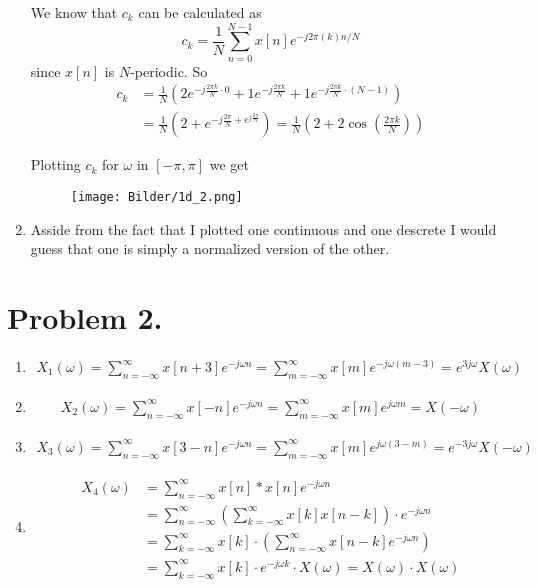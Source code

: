 \documentclass[a4paper,11pt,norsk]{article}
\begin{document}
\begin{enumerate}
        We know that $c_k$ can be calculated as 
        \[
            c_k = \frac{1}{N}\sum_{n=0}^{N-1}x[n] e^{-j2\pi(k)n/N}
        \]
        since $x[n]$ is $N$-periodic. So
        \begin{align*}
            c_k &= \frac{1}{N}\left(2e^{-j\frac{2\pi k}{N} \cdot 0} + 1e^{-j\frac{2\pi k}{N}} + 1e^{-j\frac{2\pi k}{N} \cdot (N - 1)}\right) \\
                &= \frac{1}{N}\left(2 + e^{-j\frac{2\pi}{N} + e^{j\frac{2\pi}{N}}}\right) = \frac{1}{N}\left(2 + 2\cos\left(\frac{2\pi k}{N}\right)\right)
        \end{align*}

        Plotting $c_k$ for $\omega$ in $[-\pi, \pi]$ we get
        \begin{figure}[H]
            \center
            \texttt{[image: Bilder/1d\_2.png]}
        \end{figure}

    \item Asside from the fact that I plotted one continuous and one descrete I would guess that one is simply a normalized version of the other.
\end{enumerate}

\section*{Problem 2.}
\begin{enumerate}
    \item 
        \begin{align*}
            X_1(\omega) = \sum_{n=-\infty}^{\infty} x[n+3] e^{-j\omega n} = \sum_{m=-\infty}^{\infty} x[m]e^{-j\omega(m - 3)} = e^{3j\omega} X(\omega)
        \end{align*}
    \item
        \begin{align*}
            X_2(\omega) = \sum_{n=-\infty}^{\infty} x[-n] e^{-j\omega n} = \sum_{m=-\infty}^{\infty} x[m]e^{j\omega m} = X(-\omega)
        \end{align*}
    \item
        \begin{align*}
            X_3(\omega) = \sum_{n=-\infty}^{\infty} x[3-n] e^{-j\omega n} = \sum_{m=-\infty}^{\infty} x[m]e^{j\omega (3 - m)} = e^{-3j\omega}X(-\omega)
        \end{align*}
    \item 
        \begin{align*}
            X_4(\omega) &= \sum_{n=-\infty}^{\infty} x[n] * x[n] e^{-j\omega n} \\
                        &= \sum_{n=-\infty}^{\infty} \left(\sum_{k=-\infty}^{\infty} x[k]x[n - k] \right) \cdot e^{-j\omega n} \\
                        &= \sum_{k=-\infty}^{\infty} x[k] \cdot \left(\sum_{n=-\infty}^{\infty} x[n - k] e^{-j\omega n} \right)  \\
                        &= \sum_{k=-\infty}^{\infty} x[k] \cdot e^{-j\omega k} \cdot X(\omega) = X(\omega) \cdot X(\omega)
        \end{align*}
\end{enumerate}
\end{document}
